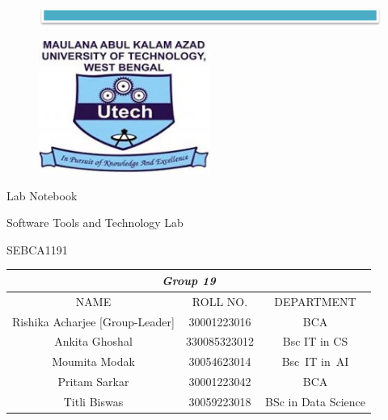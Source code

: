 \documentclass{article}
\begin{document}
\begin{figure}[h]
    \includegraphics[width=1\textwidth]{Line.png}
\end{figure}

\begin{figure}[h]
\begin{center}
    \includegraphics[width=0.5\textwidth]{MAKAUT_LOGO}
\end{center}
\end{figure}
\vspace{1cm}
\begin{center}
     {\Huge Lab Notebook}
\end{center}
\begin{center}
    {\Large
    Software Tools and Technology Lab}
\end{center}
\begin{center}
        {\Large SEBCA1191}
\end{center}
\vspace{1cm}
\renewcommand{\arraystretch}{2}
\hspace*{0.08in}
\begin{tabular}{ |c|c|c| }
\hline
\multicolumn{3}{|c|}{\Large \textbf{\textit{Group 19}}} \\
\hline
NAME & ROLL NO.& DEPARTMENT \\
\hline
Rishika Acharjee [Group-Leader]  & 30001223016 & BCA \\
\hline
Ankita Ghoshal & 330085323012 & Bsc IT in CS \\
\hline
Moumita Modak  & 30054623014 & Bsc IT in AI \\
\hline
Pritam Sarkar & 30001223042 & BCA \\
\hline
Titli Biswas & 30059223018 & BSc in Data Science \\
\hline
\end{tabular}
\vspace{1cm}
\end{document}
